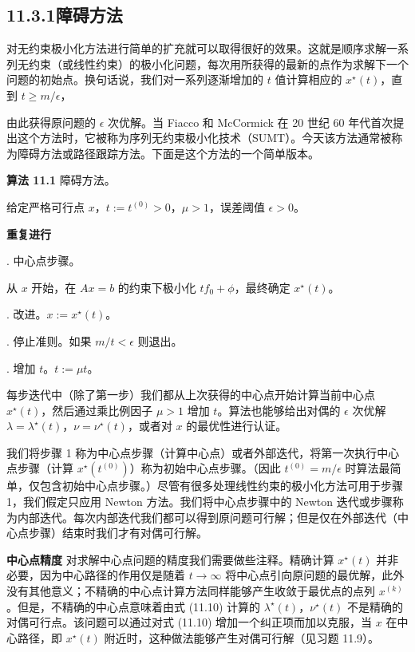 \documentclass[UTF8,12pt,a4paper,fontset=fandol]{ctexart}
\begin{document}
\subsection*{11.3.1\quad 障碍方法}

对无约束极小化方法进行简单的扩充就可以取得很好的效果。这就是顺序求解一系列无约束（或线性约束）的极小化问题，每次用所获得的最新的点作为求解下一个问题的初始点。换句话说，我们对一系列逐渐增加的 $t$ 值计算相应的 $x^\star(t)$，直到 $t\geq m/\epsilon$，

由此获得原问题的 $\epsilon$ 次优解。当 Fiacco 和 McCormick 在 20 世纪 60 年代首次提出这个方法时，它被称为序列无约束极小化技术（SUMT）。今天该方法通常被称为障碍方法或路径跟踪方法。下面是这个方法的一个简单版本。

\noindent\textbf{算法 11.1}\quad
障碍方法。

给定严格可行点 $x$，$t:=t^{(0)}>0$，$\mu>1$，误差阈值 $\epsilon>0$。

\noindent\textbf{重复进行}

. 中心点步骤。

\noindent\quad 从 $x$ 开始，在 $Ax=b$ 的约束下极小化 $tf_0+\phi$，最终确定 $x^\star(t)$。

. 改进。$x:=x^\star(t)$。

. 停止准则。如果 $m/t<\epsilon$ 则退出。

. 增加 $t$。$t:=\mu t$。

每步迭代中（除了第一步）我们都从上次获得的中心点开始计算当前中心点 $x^\star(t)$，然后通过乘比例因子 $\mu>1$ 增加 $t$。算法也能够给出对偶的 $\epsilon$ 次优解 $\lambda=\lambda^\star(t)$，$\nu=\nu^\star(t)$，或者对 $x$ 的最优性进行认证。

我们将步骤 1 称为中心点步骤（计算中心点）或者外部迭代，将第一次执行中心点步骤（计算 $x^\star(t^{(0)})$）称为初始中心点步骤。（因此 $t^{(0)}=m/\epsilon$ 时算法最简单，仅包含初始中心点步骤。）尽管有很多处理线性约束的极小化方法可用于步骤 1，我们假定只应用 Newton 方法。我们将中心点步骤中的 Newton 迭代或步骤称为内部迭代。每次内部迭代我们都可以得到原问题可行解；但是仅在外部迭代（中心点步骤）结束时我们才有对偶可行解。

\noindent\textbf{中心点精度}\quad
对求解中心点问题的精度我们需要做些注释。精确计算 $x^\star(t)$ 并非必要，因为中心路径的作用仅是随着 $t\to\infty$ 将中心点引向原问题的最优解，此外没有其他意义；不精确的中心点计算方法同样能够产生收敛于最优点的点列 $x^{(k)}$。但是，不精确的中心点意味着由式 (11.10) 计算的 $\lambda^\star(t)$，$\nu^\star(t)$ 不是精确的对偶可行点。该问题可以通过对式 (11.10) 增加一个纠正项而加以克服，当 $x$ 在中心路径，即 $x^\star(t)$ 附近时，这种做法能够产生对偶可行解（见习题 11.9）。
\end{document}
